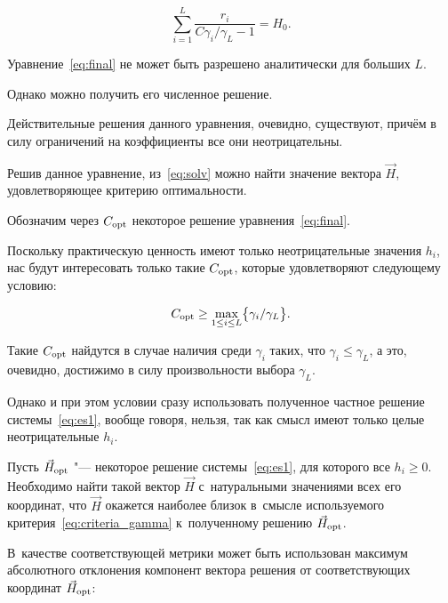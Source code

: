 \begin{equation}

\label{eq:final}

\sum_{i=1}^L{\frac{r_i}{C{\gamma_i}/{\gamma_L}-1}}=H_0.

\end{equation}

Уравнение~\eqref{eq:final} не может быть разрешено аналитически для больших $L$. 

Однако можно получить его численное решение. 

Действительные решения данного уравнения, очевидно, существуют, причём в силу ограничений на коэффициенты все они неотрицательны. 

Решив данное уравнение, из~\eqref{eq:solv} можно найти значение вектора $\vec{H}$, удовлетворяющее критерию оптимальности. 

Обозначим через $C_{\rm opt}$ некоторое решение уравнения~\eqref{eq:final}. 

Поскольку практическую ценность имеют только неотрицательные значения $h_i$, нас будут интересовать только такие $C_{\rm opt}$, которые удовлетворяют следующему условию:

\begin{equation}

\label{eq:c_opt}

C_{\rm opt} \ge \max_{1 \le i \le L} \bigl \{{\gamma_i}/{\gamma_L} \bigr \}.

\end{equation}

Такие $C_{\rm opt}$ найдутся в случае наличия среди $\gamma_i$ таких, что $\gamma_i \le \gamma_L$, а это, очевидно, достижимо в силу произвольности выбора $\gamma_L$. 

Однако и при этом условии сразу использовать полученное частное решение системы~\eqref{eq:es1}, вообще говоря, нельзя, так как смысл имеют только целые неотрицательные $h_i$. 

Пусть $\vec H_{\rm opt}$ "--- некоторое решение системы~\eqref{eq:es1}, для которого все $h_i\ge0$. Необходимо найти такой вектор $\vec{H}$ с~натуральными значениями всех его координат, что $\vec{H}$ окажется наиболее близок в~смысле используемого критерия~\eqref{eq:criteria_gamma} к~полученному решению $\vec H_{\rm opt}$. 

В~качестве соответствующей метрики может быть использован максимум абсолютного отклонения компонент вектора решения от соответствующих координат $\vec H_{\rm opt}$:

$$

